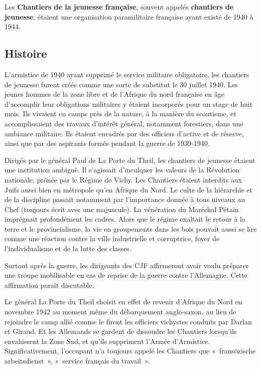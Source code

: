 



Les \textbf{Chantiers de la jeunesse française}, souvent appelés \textbf{chantiers de jeunesse}, étaient une organisation paramilitaire française ayant existé de 1940 à 1944.

\subsection{Histoire}

L'armistice de 1940 ayant supprimé le service militaire obligatoire, les chantiers de jeunesse furent créés
comme une sorte de substitut le 30 juillet 1940. Les jeunes hommes de la zone libre et de l'Afrique du nord
française en âge d'accomplir leur obligations militaires y étaient incorporés pour un stage de huit mois. Ils
vivaient en camps près de la nature, à la manière du scoutisme, et accomplissaient des travaux d'intérêt
général, notamment forestiers, dans une ambiance militaire. Ils étaient encadrés par des officiers d'active et de
réserve, ainsi que par des aspirants formés pendant la guerre de 1939-1940.

Dirigés par le général Paul de La Porte du Theil, les chantiers de jeunesse étaient une institution ambiguë. Il
s'agissait d'inculquer les valeurs de la Révolution nationale, prônée par le Régime de Vichy. Les Chantiers
étaient interdits aux Juifs aussi bien en métropole qu'en Afrique du Nord. Le culte de la hiérarchie et de la
discipline passait notamment par l'importance donnée à tous niveaux au Chef (toujours écrit avec une
majuscule). La vénération du Maréchal Pétain imprégnait profondément les cadres. Alors que le régime
exaltait le retour à la terre et le provincialisme, la vie en groupements dans les bois pouvait aussi se lire
comme une réaction contre la ville industrielle et corruptrice, foyer de l'individualisme et de la lutte des
classes.

Surtout après la guerre, les dirigeants des CJF affirmeront avoir voulu préparer une troupe mobilisable en cas
de reprise de la guerre contre l'Allemagne. Cette affirmation paraît discutable.

Le général La Porte du Theil choisit en effet de revenir d'Afrique du Nord en novembre 1942 au moment
même du débarquement anglo-saxon, au lieu de rejoindre le camp allié comme le firent les officiers vichystes
conduits par Darlan et Giraud. Et les Allemands se gardent de dissoudre les Chantiers lorsqu'ils envahissent la
Zone Sud, et qu'ils suppriment l'Armée d'Armistice. Significativement, l'occupant n'a toujours appelé les
Chantiers que «~fransözische arbeitsdienst~», «~service français du travail~».

